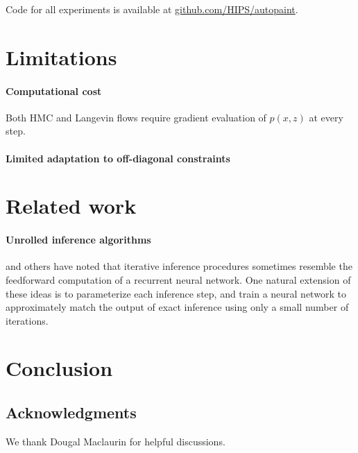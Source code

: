 \documentclass{article}
\begin{document}
Code for all experiments is available at \url{github.com/HIPS/autopaint}.

\section{Limitations}

\paragraph{Computational cost}
Both HMC and Langevin flows require gradient evaluation of $p(x,z)$ at every step.


\paragraph{Limited adaptation to off-diagonal constraints}



\section{Related work}

\paragraph{Unrolled inference algorithms}
\citet{hershey2014deep} and others have noted that iterative inference procedures sometimes resemble the feedforward computation of a recurrent neural network.
One natural extension of these ideas is to parameterize each inference step, and train a neural network to approximately match the output of exact inference using only a small number of iterations.


\section{Conclusion}

\subsection*{Acknowledgments}
We thank Dougal Maclaurin for helpful discussions.



\end{document}
